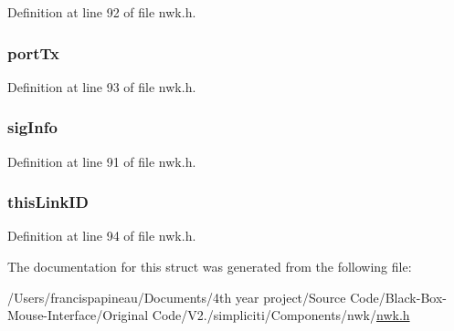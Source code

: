 \-Definition at line 92 of file nwk.\-h.

\hypertarget{structconnInfo__t_ad86d0317b274fcbe4afb501072a6483f}{
\subsubsection[{port\-Tx}]{ {\bf port\-Tx}}}\label{structconnInfo__t_ad86d0317b274fcbe4afb501072a6483f}


\-Definition at line 93 of file nwk.\-h.

\hypertarget{structconnInfo__t_a87903a190e749b4aa6e73a2aa5d18ff1}{
\subsubsection[{sig\-Info}]{ {\bf sig\-Info}}}\label{structconnInfo__t_a87903a190e749b4aa6e73a2aa5d18ff1}


\-Definition at line 91 of file nwk.\-h.

\hypertarget{structconnInfo__t_aa316c2271456d83341ee386bf74e558f}{
\subsubsection[{this\-Link\-I\-D}]{ {\bf this\-Link\-I\-D}}}\label{structconnInfo__t_aa316c2271456d83341ee386bf74e558f}


\-Definition at line 94 of file nwk.\-h.



\-The documentation for this struct was generated from the following file\-:\begin{DoxyCompactItemize}
\item 
/\-Users/francispapineau/\-Documents/4th year project/\-Source Code/\-Black-\/\-Box-\/\-Mouse-\/\-Interface/\-Original Code/\-V2./simpliciti/\-Components/nwk/\hyperlink{nwk_8h}{nwk.\-h}\end{DoxyCompactItemize}
